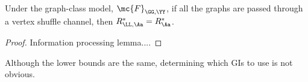 \documentclass[10pt,journal,cspaper,compsoc]{IEEEtran}
\begin{document}
\begin{thm}
	Under the graph-class model, $\mc{F}_{\GG,\YY}$, if all the graphs are passed through a vertex shuffle channel, then $R^*_{\LL,\Aa}=R^*_{\Aa}$.
\end{thm}
\begin{proof}
Information processing lemma....
\end{proof}


Although the lower bounds are the same, determining which GIs to use is not obvious.

% 
% 
% 
% 
\end{document}
